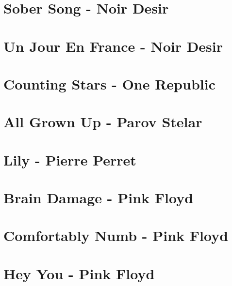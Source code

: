 \documentclass[11pt]{article}
\begin{document}
\section{Sober Song - Noir Desir}



\section*{Un Jour En France - Noir Desir}
\begin{guitar}

\end{guitar}

\section{Counting Stars - One Republic}
\begin{guitar}

\end{guitar}

\section{All Grown Up - Parov Stelar}
\begin{guitar}

\end{guitar}


\section{Lily - Pierre Perret}


\section{Brain Damage - Pink Floyd}



\section{Comfortably Numb - Pink Floyd}
\begin{guitar}

\end{guitar}


\section{Hey You - Pink Floyd}

\end{document}
